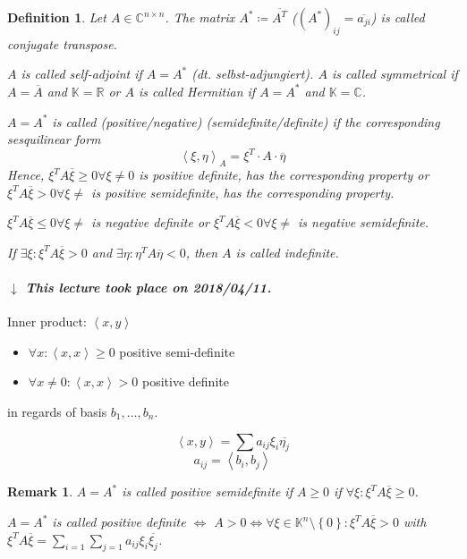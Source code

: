 \documentclass{article}
\newcounter{lecref}[section]
\numberwithin{lecref}{section}
\newtheorem{definition}[lecref]{Definition}
\newtheorem{remark}[lecref]{Remark}
\newcommand{\set}[1]{\left\{#1\right\}}
\newcommand{\angel}[1]{\left\langle#1\right\rangle}
\newcommand{\dateref}[1]{%
  \begin{mdframed}[backgroundcolor=gray!10,innerbottommargin=0pt,innertopmargin=0pt]
    \paragraph{\textit{$\downarrow$ This lecture took place on #1.}}%
  \end{mdframed}%
}
\begin{document}
\begin{definition} %
  Let $A \in \mathbb C^{n \times n}$.
  The matrix $A^* \coloneqq \overline{A^T}$ ($(A^*)_{ij} = \overline{a_{ji}}$)
  is called \emph{conjugate transpose}.

  $A$ is called \emph{self-adjoint} if $A = A^*$ (dt. \foreignlanguage{german}{selbst-adjungiert}).
  $A$ is called \emph{symmetrical} if $A = \overline{A}$ and $\mathbb K = \mathbb R$
  or $A$ is called \emph{Hermitian} if $A = A^*$ and $\mathbb K = \mathbb C$.

  $A = A^*$ is called (positive/negative) (semidefinite/definite) if the corresponding sesquilinear form
  \[ \angel{\xi, \eta}_A = \xi^T \cdot A \cdot \overline{\eta} \]
  Hence, $\xi^T A \overline{\xi} \geq 0 \forall \xi \neq 0$ is positive definite, has the corresponding property or
  $\xi^T A \overline{\xi} > 0 \forall \xi \neq$ is positive semidefinite, has the corresponding property.

  $\xi^T A \overline{\xi} \leq 0 \forall \xi \neq$ is negative definite or
  $\xi^T A \overline{\xi} < 0 \forall \xi \neq$ is negative semidefinite.

  If $\exists \xi: \xi^T A \overline{\xi} > 0$ and $\exists \eta: \eta^T A \overline{\eta} < 0$, then $A$ is called indefinite.
\end{definition}

\dateref{2018/04/11}

Inner product: $\angel{x,y}$
\begin{itemize}
  \item $\forall x: \angel{x,x} \geq 0$ positive semi-definite
  \item $\forall x \neq 0: \angel{x,x} > 0$ positive definite
\end{itemize}
in regards of basis $b_1, \dots, b_n$.

\[ \angel{x,y} = \sum a_{ij} \xi_i \overline{\eta_j} \]
\[ a_{ij} = \angel{b_i, b_j} \]

\begin{remark}
  $A = A^*$ is called \emph{positive semidefinite} if $A \geq 0$ if $\forall \xi: \xi^T A \overline{\xi} \geq 0$.

  $A = A^*$ is called \emph{positive definite} $\iff$ $A > 0 \iff \forall \xi \in \mathbb K^n\setminus \set{0}: \xi^T A \overline{\xi} > 0$
  with $\xi^T A \overline{\xi} = \sum_{i=1} \sum_{j=1} a_{ij} \xi_i \overline{\xi_j}$.
\end{remark}
\end{document}

